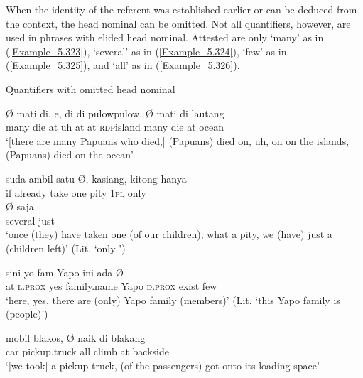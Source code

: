 When the identity of the referent was established earlier or can be deduced from the context, the head nominal can be omitted. Not all quantifiers, however, are used in  phrases with elided head nominal. Attested are only  ‘many’ as in (\ref{Example_5.323}),  ‘several’ as in (\ref{Example_5.324}),  ‘few’ as in (\ref{Example_5.325}), and  ‘all’ as in (\ref{Example_5.326}).


\begin{styleExampleTitle}
Quantifiers with omitted head nominal
\end{styleExampleTitle}

\ea
\label{Example_5.323}
 {Ø} {mati} {di,} {e,} {di} {di} {pulow{\Tilde}pulow,} {} {Ø} {mati} {di} {lautang}\\ %
 many {}   die  at  uh  at  at  \textsc{rdp}{\Tilde}island  many {}    die  at  ocean\\
\glt 
‘[there are many Papuans who died,]  (Papuans) died on, uh, on on the islands,  (Papuans) died on the ocean’ \textstyleExampleSource{[081029-002-Cv.0024-0025]}
\z

\ea
\label{Example_5.324}
 {{suda}} {ambil} {satu} {Ø,} {kasiang,} {kitong} {hanya}\\ %
 if  {already}  take  one {}   pity  \textsc{1pl}  only\\
   Ø  {saja}\\
 {several} {}   {just}\\
\glt 
‘once (they) have taken one (of our children), what a pity, we (have) just a  (children left)’ (Lit. ‘only ’) \textstyleExampleSource{[081006-024-CvEx.0070]}
\z

\ea
\label{Example_5.325}
 {sini} {yo} {fam} {Yapo} {ini} {ada} {} {Ø}\\ %
 at  \textsc{l.prox}  yes  family.name  Yapo  \textsc{d.prox}  exist  few  \\
\glt 
‘here, yes, there are (only)  Yapo family (members)’ (Lit. ‘this Yapo family is  (people)’) \textstyleExampleSource{[080922-010a-CvNF.0274]}
\z

\ea
\label{Example_5.326}
\gll {{\ldots}} {mobil} {blakos,} {Ø} {} {naik} {di} {blakang}\\ %
  { }  car  pickup.truck  {}  all  climb  at  backside\\
\glt
‘[we took] a pickup truck,  (of the passengers) got onto its loading space’ \textstyleExampleSource{[081006-017-Cv.0001]}
\z


